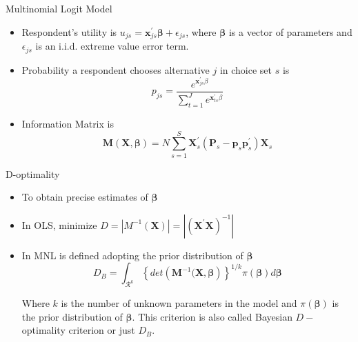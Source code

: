 \documentclass[11pt,t]{beamer}
\begin{document}
\begin{frame}[fragile]{Multinomial Logit Model}
	\begin{itemize}
		\item Respondent's utility is $u_{js} = \mathbf{x}^{'}_{js} \pmb{\beta}+ \epsilon_{js}$, where $\pmb{\beta}$ is a vector of parameters and $\epsilon_{js}$ is an i.i.d. extreme value error term.
		\vspace{5mm}
		\item Probability a respondent chooses alternative $j$ in choice set $s$ is \\
			\vspace*{-3mm}
			$$p_{js}=\frac{e^{\mathbf{x}^{'}_{js} \beta}}{\sum^{J}_{t=1} e^{\mathbf{x}^{'}_{ts} \beta}}$$
		\item Information Matrix is \\ 
		\vspace*{-4mm}
			$$\mathbf{M}(\mathbf{X},\pmb{\beta}) = N \sum_{s=1}^{S} \mathbf{X}^{'}_s(\mathbf{P}_s-\mathbf{p}_s\mathbf{p}_s^{'})\mathbf{X}_s$$
	\end{itemize}
\end{frame}

\begin{frame}[fragile]{D-optimality}
	\begin{itemize}
		\item To obtain precise estimates of $\pmb{\beta}$
		\item In OLS, minimize $D = |M^{-1}(\mathbf{X})| = |(\mathbf{X}^{'}\mathbf{X})^{-1}|$
		\item In MNL is defined adopting the prior distribution of $\pmb{\beta}$
		$$D_B = \int_{\mathcal{R}^k} \left\{det\left(\mathbf{M}^{-1}(\mathbf{X},\pmb{\beta}\right)\right\}^{1/k}\pi(\pmb{\beta})d\pmb{\beta}$$

Where $k$ is the number of unknown parameters in the model and $\pi(\pmb{\beta})$ is the prior distribution of $\pmb{\beta}$. This criterion is also called Bayesian $D-$optimality criterion or just $D_B$.
	\end{itemize}
\end{frame}
\end{document}
